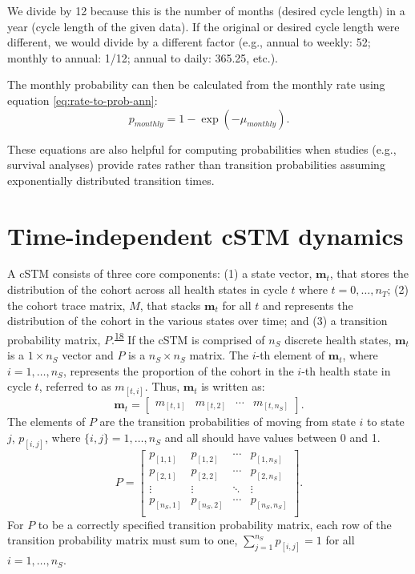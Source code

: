 \documentclass[
]{article}
\begin{document}
We divide by 12 because this is the number of months (desired cycle length) in a year (cycle length of the given data). If the original or desired cycle length were different, we would divide by a different factor (e.g., annual to weekly: 52; monthly to annual: 1/12; annual to daily: 365.25, etc.).

The monthly probability can then be calculated from the monthly rate using equation \eqref{eq:rate-to-prob-ann}:
\begin{equation}
    p_{monthly} = 1-\exp{\left(-\mu_{monthly}\right)}.
    \label{eq:rate-to-prob-month}
\end{equation}

These equations are also helpful for computing probabilities when studies (e.g., survival analyses) provide rates rather than transition probabilities assuming exponentially distributed transition times.

\hypertarget{time-independent-cstm-dynamics}{%
\section{Time-independent cSTM dynamics}\label{time-independent-cstm-dynamics}}

A cSTM consists of three core components: (1) a state vector, \(\mathbf{m}_t\), that stores the distribution of the cohort across all health states in cycle \(t\) where \(t = 0,\ldots, n_T\); (2) the cohort trace matrix, \(M\), that stacks \(\mathbf{m}_t\) for all \(t\) and represents the distribution of the cohort in the various states over time; and (3) a transition probability matrix, \(P\).\textsuperscript{\protect\hyperlink{ref-Iskandar2018a}{18}} If the cSTM is comprised of \(n_S\) discrete health states, \(\mathbf{m}_t\) is a \(1 \times n_S\) vector and \(P\) is a \(n_S \times n_S\) matrix. The \(i\)-th element of \(\mathbf{m}_t\), where \(i = 1,\ldots, n_S\), represents the proportion of the cohort in the \(i\)-th health state in cycle \(t\), referred to as \(m_{[t,i]}\). Thus, \(\mathbf{m}_t\) is written as:
\[
\mathbf{m}_t =
  \begin{bmatrix}
m_{[t,1]} & m_{[t,2]} & \cdots & m_{[t,n_S]}
\end{bmatrix}.
\]
The elements of \(P\) are the transition probabilities of moving from state \(i\) to state \(j\), \(p_{[i,j]}\), where \(\{i,j\} = 1,\ldots, n_S\) and all should have values between 0 and 1.
\[
  P = 
  \begin{bmatrix}
    p_{[1,1]} & p_{[1,2]} & \cdots & p_{[1,n_S]} \\
    p_{[2,1]} & p_{[2,2]} & \cdots & p_{[2,n_S]} \\
    \vdots    & \vdots  & \ddots & \vdots   \\
    p_{[n_S,1]} & p_{[n_S,2]} & \cdots & p_{[n_S,n_S]} \\
  \end{bmatrix}.
\]
For \(P\) to be a correctly specified transition probability matrix, each row of the transition probability matrix must sum to one, \(\sum_{j=1}^{n_S}{p_{[i,j]}} = 1\) for all \(i = 1,\ldots,n_S\).
\end{document}
